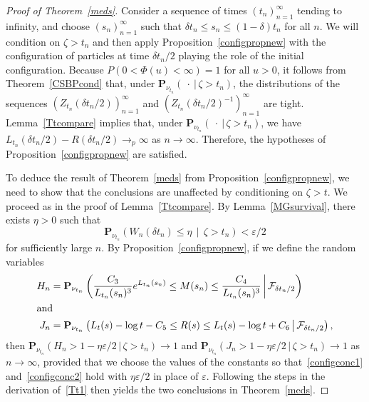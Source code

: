 \documentclass[AHL,Unicode,longabstracts,published]{cedram}
\newcommand*\eps{\varepsilon}
\renewcommand*\P{\mathbf{P}}
\newcommand\F{\mathcal{F}}
\newcommand{\1} {\mathds{1}}
\begin{document}
\begin{proof}[Proof of Theorem~\ref{meds}]
Consider a sequence of times $(t_n)_{n=1}^{\infty}$ tending to infinity, and choose $(s_n)_{n=1}^{\infty}$ such that $\delta t_n \leq s_n \leq (1 - \delta) t_n$ for all $n$. We will condition on $\zeta > t_n$ and then apply Proposition~\ref{configpropnew} with the configuration of particles at time $\delta t_n/2$ playing the role of the initial configuration. Because $P(0 < \Phi(u) < \infty) = 1$ for all $u > 0$, it follows from Theorem~\ref{CSBPcond} that, under $\P_{\nu_{t_n}}(\:\cdot\:|\,\zeta > t_n)$, the distributions of the sequences $(Z_{t_n}(\delta t_n/2))_{n=1}^{\infty}$ and $(Z_{t_n}(\delta t_n/2)^{-1})_{n=1}^{\infty}$ are tight. Lemma~\ref{Ttcompare} implies that, under $\P_{\nu_{t_n}}(\:\cdot\:|\,\zeta > t_n)$, we have $L_{t_n}(\delta t_n/2) - R(\delta t_n/2) \rightarrow_p \infty$ as $n \rightarrow \infty$. Therefore, the hypotheses of Proposition~\ref{configpropnew} are satisfied.

To deduce the result of Theorem~\ref{meds} from Proposition~\ref{configpropnew}, we need to show that the conclusions are unaffected by conditioning on $\zeta > t$. We proceed as in the proof of Lemma~\ref{Ttcompare}. By Lemma~\ref{MGsurvival}, there exists $\eta > 0$ such that
\[
\P_{\nu_{t_n}}\left(W_n(\delta t_n) \leq \eta \,\middle|\,\zeta > t_n\right) < \eps/2
\]
for sufficiently large $n$. By Proposition~\ref{configpropnew}, if we define the random variables
\begin{align*}
H_n &= \P_{\nu_{t_n}} \left(\frac{C_3}{L_{t_n}(s_n)^3} e^{L_{t_n}(s_n)} \leq M(s_n) \leq \frac{C_4}{L_{t_n}(s_n)^3} \,\middle|\, \F_{\delta t_n/2} \right)
\\
\intertext{and}
J_n &= \P_{\nu_{t_n}}\left(L_t(s) - \log t - C_5 \leq R(s) \leq L_t(s) - \log t + C_6 \, \middle| \, \F_{\delta t_n/2} \right),
\end{align*}
then $\P_{\nu_{t_n}}(H_n > 1 - \eta \eps/2 \,|\, \zeta > t_n) \rightarrow 1$ and $\P_{\nu_{t_n}}(J_n > 1 - \eta \eps/2 \,|\, \zeta > t_n) \rightarrow 1$ as $n \rightarrow \infty$, provided that we choose the values of the constants so that~\eqref{configconc1} and~\eqref{configconc2} hold with $\eta \eps/2$ in place of $\eps$.
Following the steps in the derivation of~\eqref{Tt1} then yields the two conclusions in Theorem~\ref{meds}.
\end{proof}
\end{document}
